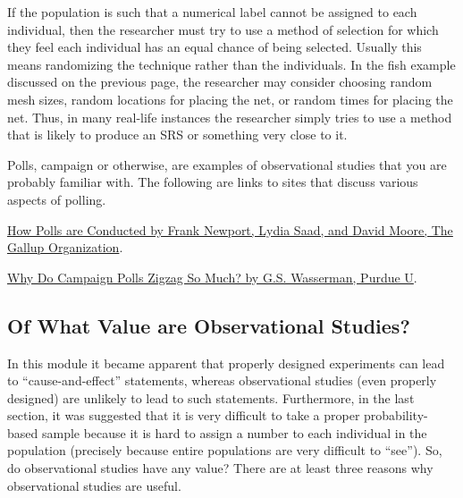 \documentclass[10pt,openany]{book}\usepackage[]{graphicx}\usepackage[]{color}
\begin{document}
\vspace{-12pt}

If the population is such that a numerical label cannot be assigned to each individual, then the researcher must try to use a method of selection for which they feel each individual has an equal chance of being selected.  Usually this means randomizing the technique rather than the individuals.  In the fish example discussed on the previous page, the researcher may consider choosing random mesh sizes, random locations for placing the net, or random times for placing the net.  Thus, in many real-life instances the researcher simply tries to use a method that is likely to produce an SRS or something very close to it.


Polls, campaign or otherwise, are examples of observational studies that you are probably familiar with.  The following are links to sites that discuss various aspects of polling.
\begin{Itemize}
  \item \href{http://media.gallup.com/PDF/FAQ/HowArePolls.pdf}{How Polls are Conducted by Frank Newport, Lydia Saad, and David Moore, The Gallup Organization}.
  \item \href{http://www2.psych.purdue.edu/~codelab/Invalid.Polls.html}{Why Do Campaign Polls Zigzag So Much? by G.S. Wasserman, Purdue U}.
\end{Itemize}

\vspace{-12pt}
\subsection{Of What Value are Observational Studies?}
\vspace{-12pt}
In this module it became apparent that properly designed experiments can lead to ``cause-and-effect'' statements, whereas observational studies (even properly designed) are unlikely to lead to such statements.  Furthermore, in the last section, it was suggested that it is very difficult to take a proper probability-based sample because it is hard to assign a number to each individual in the population (precisely because entire populations are very difficult to ``see'').  So, do observational studies have any value?  There are at least three reasons why observational studies are useful.
\end{document}
